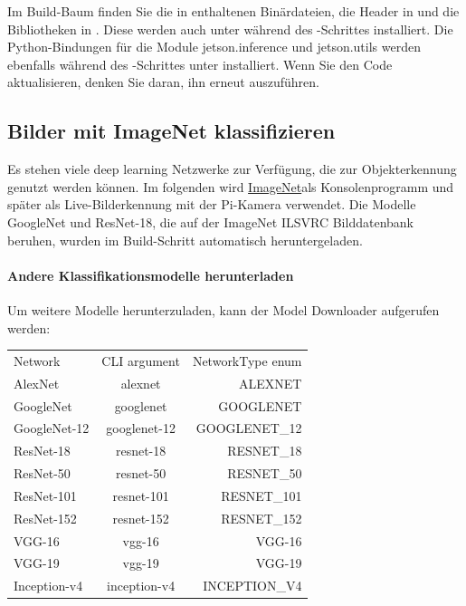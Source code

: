 Im Build-Baum finden Sie die in  enthaltenen Binärdateien, die Header in  und die Bibliotheken in . 
Diese werden auch unter  während des -Schrittes installiert. 
Die Python-Bindungen für die Module jetson.inference und jetson.utils werden ebenfalls während des -Schrittes unter  installiert. Wenn Sie den Code aktualisieren, denken Sie daran, ihn erneut auszuführen.

\subsection{Bilder mit ImageNet klassifizieren}
Es stehen viele deep learning Netzwerke zur Verfügung, die zur Objekterkennung genutzt werden können. Im folgenden wird \href{https://github.com/dusty-nv/jetson-inference/blob/master/c/imageNet.h}{ImageNet}als Konsolenprogramm und später als Live-Bilderkennung mit der Pi-Kamera verwendet.
Die Modelle GoogleNet und ResNet-18, die auf der ImageNet ILSVRC Bilddatenbank beruhen, wurden im Build-Schritt automatisch heruntergeladen.

\paragraph{Andere Klassifikationsmodelle herunterladen}

Um weitere Modelle herunterzuladen, kann der Model Downloader aufgerufen werden:

\medskip

 \newline 
{} \newline

\medskip

\begin{tabular}[h]{lcr}
	Network & CLI argument & NetworkType enum \\
	AlexNet & alexnet &	ALEXNET \\
	GoogleNet & googlenet & GOOGLENET \\
	GoogleNet-12 & googlenet-12 & GOOGLENET\_12 \\
	ResNet-18 & resnet-18 & RESNET\_18 \\
	ResNet-50 & resnet-50 & RESNET\_50 \\
	ResNet-101 & resnet-101 & RESNET\_101 \\
	ResNet-152 & resnet-152 & RESNET\_152 \\
	VGG-16 & vgg-16 & VGG-16 \\
	VGG-19 & vgg-19 & VGG-19 \\
	Inception-v4 & inception-v4 & INCEPTION\_V4 \\
\end{tabular}

